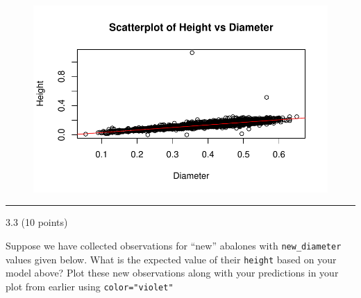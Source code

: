 \documentclass[
  letterpaper,
  DIV=11,
  numbers=noendperiod]{scrartcl}
\begin{document}
\begin{figure}[H]

{\centering \includegraphics{hw2_files/figure-pdf/unnamed-chunk-14-1.pdf}

}

\end{figure}

\begin{center}\rule{0.5\linewidth}{0.5pt}\end{center}

3.3 (10 points)

Suppose we have collected observations for ``new'' abalones with
\texttt{new\_diameter} values given below. What is the expected value of
their \texttt{height} based on your model above? Plot these new
observations along with your predictions in your plot from earlier using
\texttt{color="violet"}
\end{document}
